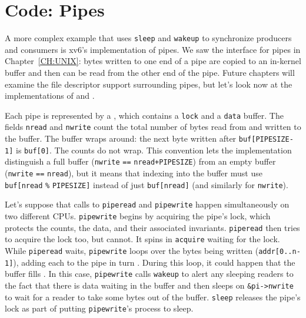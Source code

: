 \section{Code: Pipes}
A more complex example that uses \lstinline{sleep}
and \lstinline{wakeup} to synchronize producers and
consumers is xv6's implementation of pipes.
We saw the interface for pipes in Chapter~\ref{CH:UNIX}:
bytes written to one end of a pipe are copied
to an in-kernel buffer and then can be read from
the other end of the pipe.
Future chapters will examine the file descriptor support
surrounding pipes, but let's look now at the
implementations of 
and
.

Each pipe
is represented by a 
,
which contains
a 
\lstinline{lock}
and a 
\lstinline{data}
buffer.
The fields
\lstinline{nread}
and
\lstinline{nwrite}
count the total number of bytes read from
and written to the buffer.
The buffer wraps around:
the next byte written after
\lstinline{buf[PIPESIZE-1]}
is 
\lstinline{buf[0]}.
The counts do not wrap.
This convention lets the implementation
distinguish a full buffer 
(\lstinline{nwrite}
\lstinline{==}
\lstinline{nread+PIPESIZE})
from an empty buffer
(\lstinline{nwrite}
\lstinline{==}
\lstinline{nread}),
but it means that indexing into the buffer
must use
\lstinline{buf[nread}
\lstinline{%}
\lstinline{PIPESIZE]}
instead of just
\lstinline{buf[nread]} 
(and similarly for
\lstinline{nwrite}).

Let's suppose that calls to
\lstinline{piperead}
and
\lstinline{pipewrite}
happen simultaneously on two different CPUs.
\lstinline{pipewrite}
begins by acquiring the pipe's lock, which
protects the counts, the data, and their
associated invariants.
\lstinline{piperead}
then tries to acquire the lock too, but cannot.
It spins in
\lstinline{acquire}
waiting for the lock.
While
\lstinline{piperead}
waits,
\lstinline{pipewrite}
loops over the bytes being written
(\lstinline{addr[0..n-1]}),
adding each to the pipe in turn
.
During this loop, it could happen that
the buffer fills
.
In this case, 
\lstinline{pipewrite}
calls
\lstinline{wakeup}
to alert any sleeping readers to the fact
that there is data waiting in the buffer
and then sleeps on
\lstinline{&pi->nwrite}
to wait for a reader to take some bytes
out of the buffer.
\lstinline{sleep}
releases 
the pipe's lock
as part of putting
\lstinline{pipewrite}'s
process to sleep.

